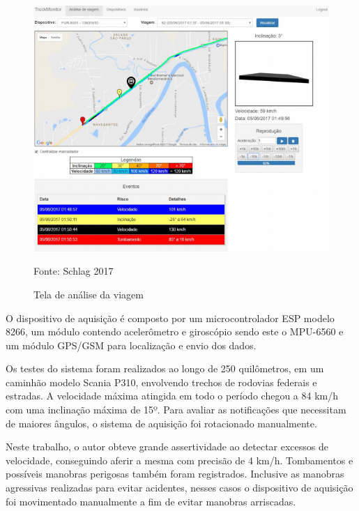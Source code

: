  \begin{figure}[H]

 \caption{Tela de análise da viagem}

  \includegraphics[width=150mm]{images/Cap2/analise.png}
  
  \scriptsize Fonte: Schlag 2017
\end{figure}

  
      




O dispositivo de aquisição é composto por um microcontrolador ESP modelo 8266, um módulo contendo acelerômetro e giroscópio sendo este o MPU-6560 e um módulo GPS/GSM para localização e envio dos dados. 

Os testes do sistema foram realizados ao longo de 250 quilômetros, em um caminhão modelo Scania P310, envolvendo trechos de rodovias federais e estradas. A velocidade máxima atingida em todo o período chegou a 84 km/h com uma inclinação máxima de 15º. Para avaliar as notificações que necessitam de maiores ângulos, o sistema de aquisição foi rotacionado manualmente.

Neste trabalho, o autor obteve grande assertividade ao detectar excessos de velocidade, conseguindo aferir a mesma com precisão de 4 km/h. Tombamentos e possíveis manobras perigosas também foram registrados. Inclusive as manobras agressivas realizadas para evitar acidentes, nesses casos o dispositivo de aquisição foi movimentado manualmente a fim de evitar manobras arriscadas. 

